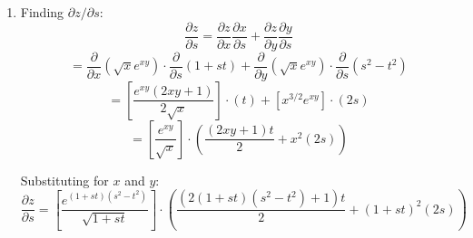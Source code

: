 \begin{Answer}[ref = chain]
\begin{enumerate}
    Substituting for $x$ and $y$: 
    $$\frac{\partial z}{\partial s} = \left( \frac{2 \left( t \ln{s} \right)}{
    \left[ \left( t\ln{s} \right)^2 + \left( se^t \right)^2 \right]^2 + 1} 
    \right) \cdot \left( \frac{t}{s} \right) + \left( \frac{2 \left( se^t 
    \right)}{\left[ \left( t\ln{s} \right)^2 + \left( se^t \right)^2 
    \right]^2 + 1} \right) \cdot \left( e^t \right)$$
    $$= \left( \frac{2}{\left[ t^2 \left( \ln{s} \right)^2 + s^2e^{2t} \right]^2 
    + 1} \right) \cdot \left( \frac{t^2 \ln{s}}{s} + se^{2t} \right)$$

    Finding $\partial z / \partial t$:
    $$\frac{\partial z}{\partial t} = \frac{\partial z}{\partial x} \frac{
    \partial x}{\partial t} + \frac{\partial z}{\partial y} \frac{\partial y}{
    \partial t}$$
    $$= \frac{\partial}{\partial x} \left( \arctan{ \left( x^2 + y^2 \right)} 
    \right) \cdot \frac{\partial}{\partial t} \left( t \ln{s} \right) + \frac{
    \partial}{\partial y} \left( \arctan{ \left( x^2 + y^2 \right)} \right) 
    \cdot \frac{\partial}{\partial t} \left( se^t \right)$$
    $$= \left( \frac{2x}{\left( x^2 + y^2 \right)^2 + 1} \right) \cdot \left( 
    \ln{s} \right) + \left( \frac{2y}{\left( x^2 + y^2 \right)^2 + 1} \right) 
    \cdot \left( se^t \right)$$

    Substituting for $x$ and $y$:
    $$\frac{\partial z}{\partial t} = \left( \frac{2}{\left[ \left( t\ln{s} 
    \right)^2 + \left( se^t \right)^2 \right]^2 + 1} \right) \cdot \left[ t 
    \left( \ln{s} \right)^2 + s^2e^{2t} \right]$$

    \item Finding $\partial z / \partial s$:
    $$\frac{\partial z}{\partial s} = \frac{\partial z}{\partial x} \frac{
    \partial x}{\partial s} + \frac{\partial z}{\partial y} \frac{\partial y}{
    \partial s}$$
    $$= \frac{\partial}{\partial x} \left( \sqrt{x}e^{xy} \right) \cdot \frac{
    \partial}{\partial s} \left( 1 + st \right) + \frac{\partial}{\partial y} 
    \left( \sqrt{x}e^{xy} \right) \cdot \frac{\partial}{\partial s} \left( s^2 
    - t^2 \right)$$
    $$= \left[ \frac{e^{xy} \left( 2xy + 1 \right)}{2\sqrt{x}} \right] \cdot 
    \left( t \right) + \left[ x^{3/2}e^{xy} \right] \cdot \left( 2s \right)$$
    $$= \left[ \frac{e^{xy}}{\sqrt{x}} \right] \cdot \left( \frac{\left(2xy + 
    1 \right)t}{2} + x^2 \left( 2s \right) \right)$$

    Substituting for $x$ and $y$:
    $$\frac{\partial z}{\partial s} = \left[ \frac{e^{(1 + st)(s^2 - t^2)}}{
    \sqrt{1 + st}} \right] \cdot \left( \frac{\left( 2(1 + st)(s^2 - t^2) + 1 
    \right)t }{2} + \left( 1 + st \right)^2 \left( 2s \right) \right)$$


\end{enumerate}
\end{Answer}

